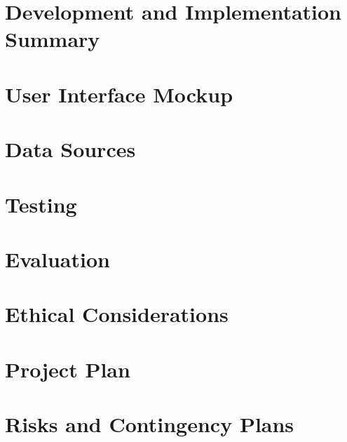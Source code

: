 \documentclass[journal,10pt]{IEEEtran}
\begin{document}
\section{Development and Implementation Summary}
\section{User Interface Mockup}
\section{Data Sources}
\section{Testing}
\section{Evaluation}
\section{Ethical Considerations}
\section{Project Plan}
\section{Risks and Contingency Plans}



\end{document}
